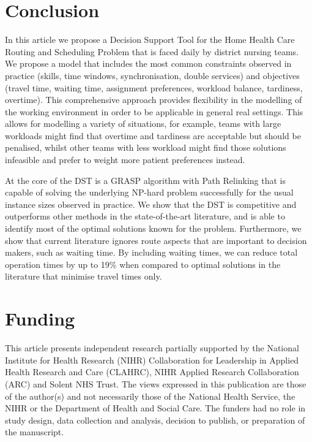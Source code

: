 \documentclass[a4paper,11pt,authoryear]{elsarticle}
\begin{document}
\section{Conclusion}
\label{sec:conclusion}
\noindent In this article we propose a Decision Support Tool for the Home Health Care Routing and Scheduling Problem that is faced daily by district nursing teams. We propose a model that includes the most common constraints observed in practice (skills, time windows, synchronisation, double services) and objectives (travel time, waiting time, assignment preferences, workload balance, tardiness, overtime). This comprehensive approach provides flexibility in the modelling of the working environment in order to be applicable in general real settings. This allows for modelling a variety of situations, for example, teams with large workloads might find that overtime and tardiness are acceptable but should be penalised, whilst other teams with less workload might find those solutions infeasible and prefer to weight more patient preferences instead.

At the core of the DST is a GRASP algorithm with Path Relinking that is capable of solving the underlying NP-hard problem successfully for the usual instance sizes observed in practice. We show that the DST is competitive and outperforms other methods in the state-of-the-art literature, and is able to identify most of the optimal solutions known for the problem. Furthermore, we show that current literature ignores route aspects that are important to decision makers, such as waiting time. By including waiting times, we can reduce total operation times by up to 19\% when compared to optimal solutions in the literature that minimise travel times only.

\section{Funding}
\label{sec:funding}
\noindent This article presents independent research partially supported by the National Institute for Health Research (NIHR) Collaboration for Leadership in Applied Health Research and Care (CLAHRC), NIHR Applied Research Collaboration (ARC) and Solent NHS Trust. The views expressed in this publication are those of the author(s) and not necessarily those of the National Health Service, the NIHR or the Department of Health and Social Care. The funders had no role in study design, data collection and analysis, decision to publish, or preparation of the manuscript.
\end{document}
